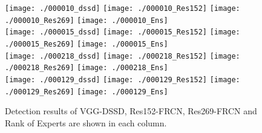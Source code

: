 \documentclass[10pt,twocolumn,letterpaper]{article}
\begin{document}
\begin{figure*}[!tbp]
\begin{center}
\vspace{-8pt}
\texttt{[image: ./000010\_dssd]}
\texttt{[image: ./000010\_Res152]}
\texttt{[image: ./000010\_Res269]}
\texttt{[image: ./000010\_Ens]}
\\
\texttt{[image: ./000015\_dssd]}
\texttt{[image: ./000015\_Res152]}
\texttt{[image: ./000015\_Res269]}
\texttt{[image: ./000015\_Ens]}
\\
\texttt{[image: ./000218\_dssd]}
\texttt{[image: ./000218\_Res152]}
\texttt{[image: ./000218\_Res269]}
\texttt{[image: ./000218\_Ens]}
\\
\texttt{[image: ./000129\_dssd]}
\texttt{[image: ./000129\_Res152]}
\texttt{[image: ./000129\_Res269]}
\texttt{[image: ./000129\_Ens]}
\\
\vspace{-5pt}
\end{center}
\caption{{Detection results of VGG-DSSD, Res152-FRCN, Res269-FRCN and Rank of Experts are shown in each column.}}
\vspace{-5pt}
\label{fig:Object_detection}
\end{figure*}




\end{document}
